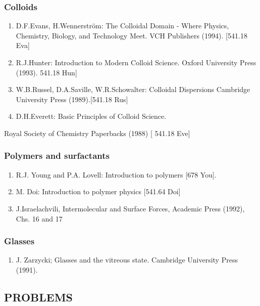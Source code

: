 \documentclass[
  letterpaper,
  DIV=11,
  numbers=noendperiod]{scrartcl}
\providecommand{\tightlist}{%
  \setlength{\itemsep}{0pt}\setlength{\parskip}{0pt}}\usepackage{longtable,booktabs,array}
\begin{document}
\subsubsection{Colloids}\label{colloids-1}

\begin{enumerate}
\def\labelenumi{(\arabic{enumi})}
\tightlist
\item
  D.F.Evans, H.Wennerström: The Colloidal Domain - Where Physics,
  Chemistry, Biology, and Technology Meet. VCH Publishers (1994).
  {[}541.18 Eva{]}
\item
  R.J.Hunter: Introduction to Modern Colloid Science. Oxford University
  Press (1993). 541.18 Hun{]}
\item
  W.B.Russel, D.A.Saville, W.R.Schowalter: Colloidal Dispersions
  Cambridge University Press (1989).{[}541.18 Rus{]}
\item
  D.H.Everett: Basic Principles of Colloid Science.
\end{enumerate}

Royal Society of Chemistry Paperbacks (1988) {[} 541.18 Eve{]}

\subsubsection{Polymers and surfactants}\label{polymers-and-surfactants}

\begin{enumerate}
\def\labelenumi{(\arabic{enumi})}
\tightlist
\item
  R.J. Young and P.A. Lovell: Introduction to polymers {[}678 You{]}.
\item
  M. Doi: Introduction to polymer physics {[}541.64 Doi{]}
\item
  J.Israelachvili, Intermolecular and Surface Forces, Academic Press
  (1992), Chs. 16 and 17
\end{enumerate}

\subsubsection{Glasses}\label{glasses-1}

\begin{enumerate}
\def\labelenumi{(\arabic{enumi})}
\tightlist
\item
  J. Zarzycki; Glasses and the vitreous state. Cambridge University
  Press (1991).
\end{enumerate}

\subsection{PROBLEMS}\label{problems}
\end{document}
